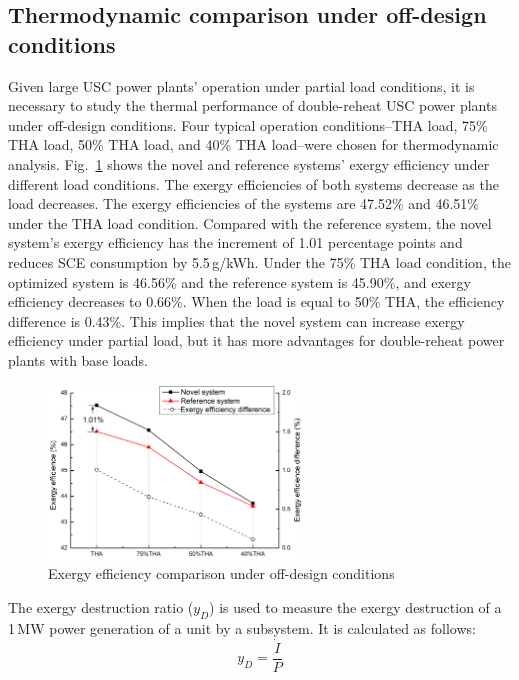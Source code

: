 \documentclass[preprint,12pt]{elsarticle}
\begin{document}
\subsection{Thermodynamic comparison under off-design conditions}
\label{ssub:offdesing_compare}
Given large USC power plants' operation under partial load conditions, it is necessary to study the thermal performance of double-reheat USC power plants under off-design conditions.
Four typical operation conditions--THA load, 75\% THA load, 50\% THA load, and 40\% THA load--were chosen for thermodynamic analysis. 
Fig.~\ref{fig:partload_efficiency} shows the novel and reference systems' exergy efficiency under different load conditions. The exergy efficiencies of both systems decrease as the load decreases.
The exergy efficiencies of the systems are 47.52\% and 46.51\% under the THA load condition. Compared with the reference system, the novel system's exergy efficiency has the increment of 1.01 percentage points and reduces SCE consumption by 5.5\,g/kWh. %
Under the 75\% THA load condition, the optimized system %
is 46.56\% and the reference system is 45.90\%, and exergy efficiency decreases to 0.66\%. 
When the load is equal to 50\% THA, the efficiency difference is 0.43\%.
This implies that the novel system can increase exergy efficiency under partial load, but it has more advantages for double-reheat power plants with base loads.

\begin{figure}[htbp]
\centering
\includegraphics[width=0.6\textwidth]{fig/partload_efficiency.png}
\caption{Exergy efficiency comparison under off-design conditions} 
\label{fig:partload_efficiency}
\end{figure}
  The exergy destruction ratio ($y_{D}$) is used to measure the exergy destruction of a 1\,MW power generation of a unit by a subsystem. It is calculated as follows:
\begin{equation}
y_{D}=\frac{\dot{I}}{P}
\end{equation}
\end{document}
